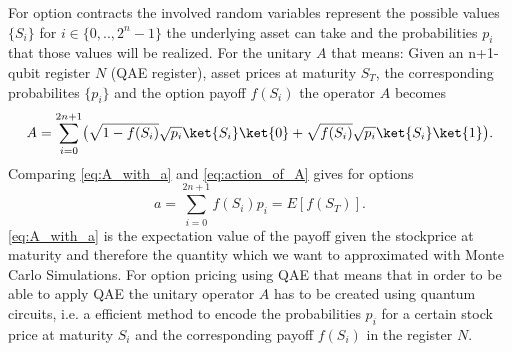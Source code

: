 \documentclass[../../main.tex]{subfiles}
\begin{document}
For option contracts the involved random variables represent the possible values $ \{ S_i \} $ for $ i \in \{ 0,..,2^n-1 \} $ the underlying asset can take and the probabilities $p_i$ that those values will be realized.
For the unitary $A$ that means: Given an n+1-qubit register $N$ (QAE register), asset prices at maturity $S_T $, the corresponding probabilites $ \{ p_i \}$ and the option payoff
$f(S_i)$ the operator $A$ becomes
\begin{equation}\label{eq:A_with_a}
  A = \sum_{i=0}^{2n+1} \bigl ( \sqrt{1-f(S_i)}\sqrt{p_i}\ket{S_i}\ket{0} + \sqrt{f(S_i)}\sqrt{p_i}\ket{S_i}\ket{1} \bigr ).
\end{equation}
Comparing \ref{eq:A_with_a} and \ref{eq:action_of_A} gives for options
\begin{equation}\label{eq:aForOption}
  a = \sum_{i=0}^{2n+1} f(S_i)p_i = E[f(S_T)].
\end{equation}
\ref{eq:A_with_a} is the expectation value of the payoff given the stockprice at maturity and therefore the quantity which we want to approximated with Monte Carlo Simulations.
For option pricing using QAE that means that in order to be able to apply QAE the unitary operator $A$ has to be created using quantum circuits, i.e. a efficient method to encode
the probabilities $p_i$ for a certain stock price at maturity $S_i$ and the corresponding payoff $f(S_i)$ in the register $N$.
\end{document}
